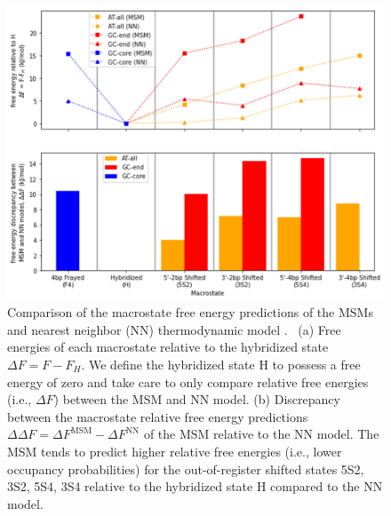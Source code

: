 \documentclass[journal=jpcbfk,manuscript=article]{achemso}
\newcommand*{\rood}[1]{{\color{red}{#1}}}
\begin{document}
\begin{figure}[ht!]
	\begin{center} 
        \includegraphics[width=160mm, scale=1]{Fig3.pdf}
        \caption{Comparison of the macrostate free energy predictions of the MSMs and nearest neighbor (NN) thermodynamic model \rood{at the sequence melting temperatures}.~\citep{SantaLucia1998AThermodynamics, Santalucia2004TheMotifs} (a) Free energies of each macrostate relative to the hybridized state $\Delta F = F - F_H$. We define the hybridized state H to possess a free energy of zero and take care to only compare relative free energies (i.e., $\Delta F$) between the MSM and NN model. (b) Discrepancy between the macrostate relative free energy predictions $\Delta \Delta F = \Delta F^\mathrm{MSM} - \Delta F^\mathrm{NN}$ of the MSM relative to the NN model. The MSM tends to predict higher relative free energies (i.e., lower occupancy probabilities) for the out-of-register shifted states 5S2, 3S2, 5S4, 3S4 relative to the hybridized state H compared to the NN model.}
        \label{fig:NN_table}
	\end{center}
\end{figure}
\end{document}
